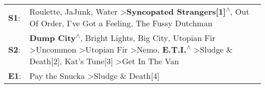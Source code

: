 \begin{supertabular}{p{0.03\textwidth}p{0.92\textwidth}}
 \textbf{S1}:  &                                                                                                                                                                                     Roulette\textsuperscript{}, \enspace JaJunk\textsuperscript{}, \enspace Water\textsuperscript{} \textgreater \enspace \textbf{Syncopated Strangers[1]\textsuperscript{$\wedge$}}, \enspace Out Of Order\textsuperscript{}, \enspace I've Got a Feeling\textsuperscript{}, \enspace The Fussy Dutchman\textsuperscript{}  \enspace  \\
 \textbf{S2}:  &  \textbf{Dump City\textsuperscript{$\wedge$}}, \enspace Bright Lights, Big City\textsuperscript{}, \enspace Utopian Fir\textsuperscript{} \textgreater \enspace Uncommon\textsuperscript{} \textgreater \enspace Utopian Fir\textsuperscript{} \textgreater \enspace Nemo\textsuperscript{}, \enspace \textbf{E.T.I.\textsuperscript{$\wedge$}} \textgreater \enspace Sludge \& Death[2]\textsuperscript{}, \enspace Kat's Tune[3]\textsuperscript{} \textgreater \enspace Get In The Van\textsuperscript{}  \enspace  \\
 \textbf{E1}:  &                                                                                                                                                                                                                                                                                                                                                                                                                 Pay the Snucka\textsuperscript{} \textgreater \enspace Sludge \& Death[4]\textsuperscript{}  \enspace  \\
\end{supertabular}
